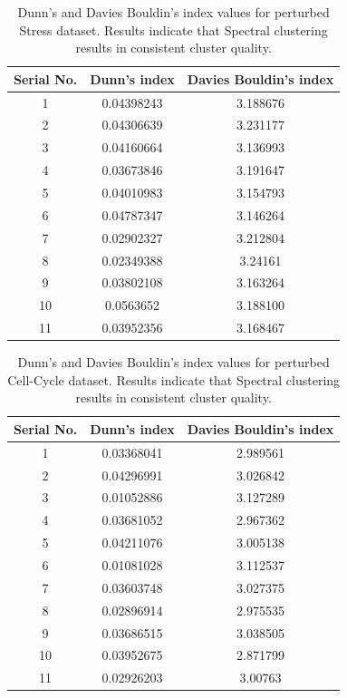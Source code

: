 \begin{table}[p]
\centering
\begin{tabular}{|c|c|c|}
\hline
Serial No. & Dunn's index  & Davies Bouldin's index\\
\hline 
1 & 0.04398243 & 3.188676 \\
2 & 0.04306639 & 3.231177 \\
3 & 	0.04160664 & 3.136993 \\
4 & 	0.03673846 & 3.191647 \\
5 & 	0.04010983 & 3.154793 \\
6 & 	0.04787347 & 3.146264 \\
7 & 	0.02902327 & 3.212804 \\
8 & 	0.02349388 & 3.24161 \\
9 & 	0.03802108 & 3.163264 \\
10 & 	0.0563652 & 3.188100 \\
11 & 	0.03952356 & 3.168467 \\
\hline 
\end{tabular}
\caption[Dunn's and Davies Bouldin's index values for perturbed Stress dataset.]{Dunn's and Davies Bouldin's index values for perturbed Stress dataset. Results indicate that Spectral clustering results in consistent cluster quality.}
\label{tab:stress_only_perturb}
\end{table}

\begin{table}[p]
\centering
\begin{tabular}{|c|c|c|}
\hline
Serial No. & Dunn's index  & Davies Bouldin's index\\
\hline
1 & 0.03368041 & 2.989561 \\
2 & 0.04296991 & 3.026842 \\
3 & 0.01052886 & 3.127289 \\
4 & 0.03681052 & 2.967362 \\
5 & 0.04211076 & 3.005138 \\
6 & 0.01081028 & 3.112537 \\
7 & 0.03603748 & 3.027375 \\
8 & 0.02896914 & 2.975535 \\
9 & 0.03686515 & 3.038505 \\
10 & 0.03952675 & 2.871799 \\
11 & 0.02926203 & 3.00763 \\
\hline 
\end{tabular}
\caption[Dunn's and Davies Bouldin's index values for perturbed Cell-Cycle dataset.]{Dunn's and Davies Bouldin's index values for perturbed Cell-Cycle dataset. Results indicate that Spectral clustering results in consistent cluster quality.}
\label{tab:cellcycle_only_perturb}
\end{table}

